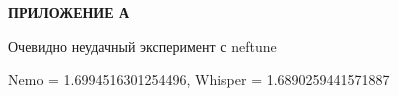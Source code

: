 \newpage
\begin{center}
  \textbf{\large ПРИЛОЖЕНИЕ А}
\end{center}

Очевидно неудачный эксперимент с neftune

Nemo = 1.6994516301254496, Whisper = 1.6890259441571887
